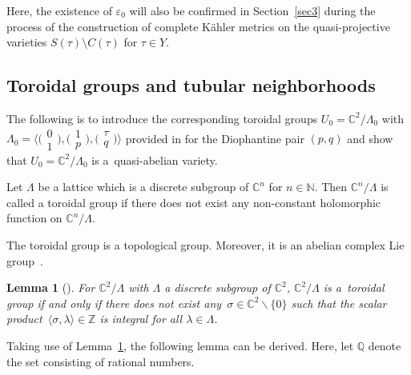 \documentclass[10pt,a4paper]{amsart}
\numberwithin{equation}{section}
\newtheorem{Lemma}[Theorem]{Lemma}
\begin{document}
Here, the existence of $\varepsilon_0$ will also be confirmed in Section~\ref{sec3} during the process of the construction of complete K\"ahler metrics on the quasi-projective varieties $S(\tau)\setminus C(\tau)$ for $\tau \in Y$.

\subsection{Toroidal groups and tubular neighborhoods}

The following is to introduce the corresponding toroidal groups $U_0=\mathbb{C}^2/\Lambda_0$ with
$\Lambda_0=\big\langle\big(\begin{smallmatrix}0 \\1\end{smallmatrix}\big),\allowbreak\big(\begin{smallmatrix}1 \\p\end{smallmatrix}\big),\big(\begin{smallmatrix}\tau \\q\end{smallmatrix}\big)\big\rangle$
provided in \cite{Takayuki-Takato2} for the Diophantine pair $(p,q)$ and show that $U_0=\mathbb{C}^2/\Lambda_0$ is a~quasi-abelian variety.

\begin{Definition} \label{Definition2.10}
 Let $\Lambda$ be a lattice which is a discrete subgroup of $\mathbb{C}^n$ for $n\in \mathbb{N}$. Then $\mathbb{C}^n/\Lambda$ is called a toroidal group if there does not exist any non-constant holomorphic function on $\mathbb{C}^n/\Lambda$.
\end{Definition}

The toroidal group is a topological group. Moreover, it is an abelian complex Lie group~\cite{Yukitaka-Klaus}.

\begin{Lemma}[{\cite[Theorem~1.1.4]{Yukitaka-Klaus}}] \label{Lemma2.11}
 For $\mathbb{C}^2/\Lambda$ with $\Lambda$ a discrete subgroup of $\mathbb{C}^2$, $\mathbb{C}^2/\Lambda$ is a~toroidal group if and only if there does not exist any~${\sigma \in \mathbb{C}^2 \backslash \{ 0 \}}$ such that the scalar product~${\langle \sigma,\lambda \rangle \in \mathbb{Z}}$ is integral for all $ \lambda \in \Lambda $.
\end{Lemma}

Taking use of Lemma~\ref{Lemma2.11}, the following lemma can be derived. Here, let $\mathbb{Q}$ denote the set consisting of rational numbers.
\end{document}
